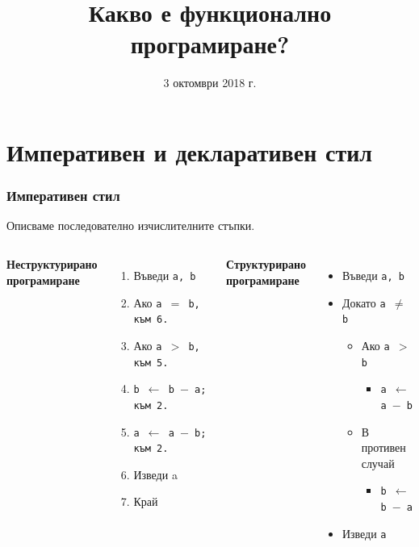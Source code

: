 \documentclass{beamer}
\title[Какво е ФП?]{Какво е функционално програмиране?}
\date{3 октомври 2018 г.}
\begin{document}
\begin{frame}
  \titlepage
\end{frame}

\section*{Императивен и декларативен стил}

\begin{frame}
  \frametitle{Императивен стил}

  Описваме последователно изчислителните стъпки.\\[1em]
  \begin{columns}[t,onlytextwidth]

    \textbf{Неструктурирано\\програмиране}\\[1em]
    \begin{enumerate}
    \item Въведи \tt a, \tt b
    \item Ако \tt{a $=$ b}, към 6.
    \item Ако \tt{a $>$ b}, към 5.
    \item \tt{b $\leftarrow$ b $-$ a}; към 2.
    \item \tt{a $\leftarrow$ a $-$ b}; към 2.
    \item Изведи a
    \item Край
    \end{enumerate}

    \textbf{Структурирано\\програмиране}\\[1em]
    \begin{itemize}
    \item Въведи \tt a, \tt b
    \item Докато \tt{a $\neq$ b}
      \begin{itemize}
      \item Ако \tt{a $>$ b}
        \begin{itemize}
        \item \tt{a $\leftarrow$ a $-$ b}
        \end{itemize}
      \item В противен случай
        \begin{itemize}
        \item \tt{b $\leftarrow$ b $-$ a}
        \end{itemize}
      \end{itemize}
    \item Изведи \tt a
    \end{itemize}

  \end{columns}
\end{frame}
\end{document}

